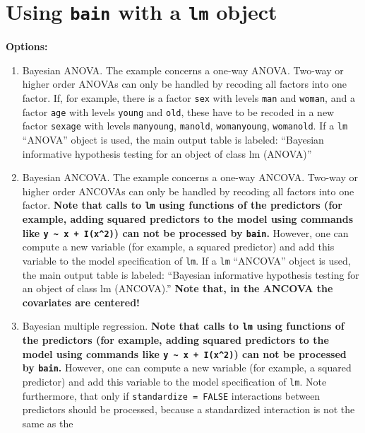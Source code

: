 \documentclass[
]{book}
\begin{document}
\hypertarget{using-bain-with-a-lm-object}{%
\section{\texorpdfstring{Using \texttt{bain} with a \texttt{lm} object}{Using bain with a lm object}}\label{using-bain-with-a-lm-object}}

\textbf{Options:}

\begin{enumerate}
\def\labelenumi{\alph{enumi})}
\item
  Bayesian ANOVA. The example concerns a one-way ANOVA. Two-way or higher
  order ANOVAs can only be handled by recoding all factors into one
  factor. If, for example, there is a factor \texttt{sex} with levels \texttt{man} and \texttt{woman},
  and a factor \texttt{age} with levels \texttt{young} and \texttt{old}, these have to be recoded in a
  new factor \texttt{sexage} with levels \texttt{manyoung}, \texttt{manold}, \texttt{womanyoung}, \texttt{womanold}.
  If a \texttt{lm} ``ANOVA'' object is used, the main output table is
  labeled: ``Bayesian informative hypothesis testing for an object
  of class lm (ANOVA)''
\item
  Bayesian ANCOVA. The example concerns a one-way ANCOVA. Two-way or higher
  order ANCOVAs can only be handled by recoding all factors into one
  factor. \textbf{Note that calls to \texttt{lm} using functions of the predictors
  (for example, adding squared predictors to the model using commands like
  \texttt{y\ \textasciitilde{}\ x\ +\ I(x\^{}2)})
  can not be processed by \texttt{bain}.} However, one can compute a new variable
  (for example, a squared predictor) and add this variable to the
  model specification of \texttt{lm}. If a \texttt{lm} ``ANCOVA'' object is used, the
  main output table is
  labeled: ``Bayesian informative hypothesis testing for an object
  of class lm (ANCOVA).'' \textbf{Note that, in
  the ANCOVA the covariates are centered!}
\item
  Bayesian multiple regression. \textbf{Note that calls to \texttt{lm} using
  functions of the predictors (for example, adding squared predictors
  to the model using commands like \texttt{y\ \textasciitilde{}\ x\ +\ I(x\^{}2)})
  can not be processed by \texttt{bain}.} However, one can compute a new variable
  (for example, a squared predictor) and add this variable to the
  model specification of \texttt{lm}. Note furthermore, that only if
  \texttt{standardize\ =\ FALSE} interactions between predictors should
  be processed, because a standardized interaction is not the same as the

\end{enumerate}
\end{document}
